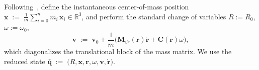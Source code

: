 \documentclass[letterpaper, 10 pt, conference]{ieeeconf}  %
\newcommand{\matr}[1]{\bm{#1}}
\newcommand{\R}{\matr{R}}
\newcommand{\0}{\matr{0}}
\newcommand{\SE}{\mathrm{SE}}
\begin{document}

Following~\cite{marin}, define the instantaneous center-of-mass position $\displaystyle{\mathbf x \;:=\; \frac{1}{m}\sum_{i=0}^{n} m_i\,\mathbf x_i \in\mathbb R^3}$, and perform the standard change of variables $R:=R_0$, $\omega:=\omega_0$,
\begin{equation}
\mathbf v \;:=\; \mathbf v_0 + \frac{1}{m}\Big(\mathbf M_{v\dot r}(\mathbf r)\dot{\mathbf r} + \mathbf C(\mathbf r)\omega\Big),
\label{eq:vbar_def}
\end{equation}
which diagonalizes the translational block of the mass matrix. We use the reduced state
$\bar{\mathbf q} \;:=\; \big(R,\mathbf x,\mathbf r,\omega,\mathbf v,\dot{\mathbf r}\big)$.
\end{document}
